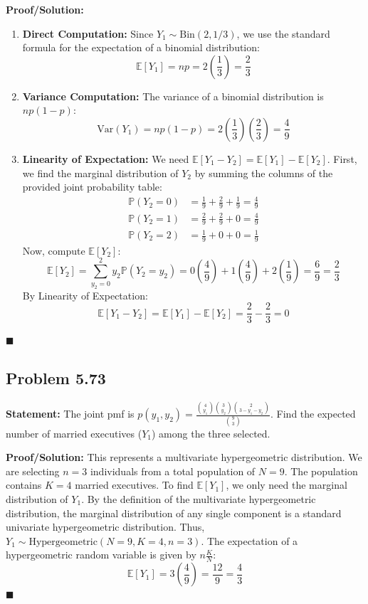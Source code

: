 \documentclass[11pt, a4paper]{article}
\theoremstyle{definition}
\theoremstyle{remark}
\newcommand{\E}{\mathbb{E}}
\newcommand{\Prob}{\mathbb{P}}
\newcommand{\Var}{\mathrm{Var}}
\begin{document}
\textbf{Proof/Solution:}
\begin{enumerate}[label=\alph*)]
    \item \textbf{Direct Computation:} Since $Y_1 \sim \text{Bin}(2, 1/3)$, we use the standard formula for the expectation of a binomial distribution:
    \[
    \E[Y_1] = np = 2 \left(\frac{1}{3}\right) = \frac{2}{3}
    \]
    \item \textbf{Variance Computation:} The variance of a binomial distribution is $np(1-p)$:
    \[
    \Var(Y_1) = np(1-p) = 2 \left(\frac{1}{3}\right) \left(\frac{2}{3}\right) = \frac{4}{9}
    \]
    \item \textbf{Linearity of Expectation:} We need $\E[Y_1 - Y_2] = \E[Y_1] - \E[Y_2]$. First, we find the marginal distribution of $Y_2$ by summing the columns of the provided joint probability table:
    \begin{align*}
        \Prob(Y_2 = 0) &= \frac{1}{9} + \frac{2}{9} + \frac{1}{9} = \frac{4}{9} \\
        \Prob(Y_2 = 1) &= \frac{2}{9} + \frac{2}{9} + 0 = \frac{4}{9} \\
        \Prob(Y_2 = 2) &= \frac{1}{9} + 0 + 0 = \frac{1}{9}
    \end{align*}
    Now, compute $\E[Y_2]$:
    \[
    \E[Y_2] = \sum_{y_2=0}^2 y_2 \Prob(Y_2 = y_2) = 0\left(\frac{4}{9}\right) + 1\left(\frac{4}{9}\right) + 2\left(\frac{1}{9}\right) = \frac{6}{9} = \frac{2}{3}
    \]
    By Linearity of Expectation:
    \[
    \E[Y_1 - Y_2] = \E[Y_1] - \E[Y_2] = \frac{2}{3} - \frac{2}{3} = 0
    \]
\end{enumerate}
\hfill $\blacksquare$

\subsection{Problem 5.73}
\textbf{Statement:} The joint pmf is $p(y_1, y_2) = \frac{\binom{4}{y_1}\binom{3}{y_2}\binom{2}{3-y_1-y_2}}{\binom{9}{3}}$. Find the expected number of married executives ($Y_1$) among the three selected.

\textbf{Proof/Solution:}
This represents a multivariate hypergeometric distribution. We are selecting $n=3$ individuals from a total population of $N=9$. The population contains $K=4$ married executives. 
To find $\E[Y_1]$, we only need the marginal distribution of $Y_1$. By the definition of the multivariate hypergeometric distribution, the marginal distribution of any single component is a standard univariate hypergeometric distribution.
Thus, $Y_1 \sim \text{Hypergeometric}(N=9, K=4, n=3)$.
The expectation of a hypergeometric random variable is given by $n \frac{K}{N}$:
\[
\E[Y_1] = 3 \left(\frac{4}{9}\right) = \frac{12}{9} = \frac{4}{3}
\]
\hfill $\blacksquare$
\end{document}
